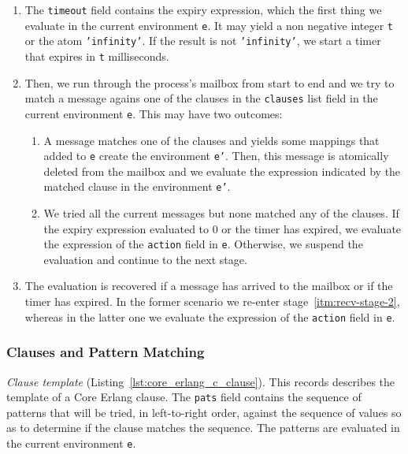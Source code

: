 \begin{enumerate}
  \item The \texttt{timeout} field contains the expiry expression, which the
    first thing we evaluate in the current environment \texttt{e}. It may yield a non
    negative integer \texttt{t} or the atom \texttt{'infinity'}. If the result
    is not \texttt{'infinity'}, we start a timer that expires in \texttt{t}
    milliseconds.
  \item\label{itm:recv-stage-2} Then, we run through the process's mailbox from start to end and we try
    to match a message agains one of the clauses in the \texttt{clauses} list
    field in the current environment \texttt{e}. This may have two outcomes:
    \begin{enumerate}
      \item A message matches one of the clauses and yields some mappings that
        added to \texttt{e} create the environment \texttt{e'}. Then, this
        message is atomically deleted from the mailbox and we evaluate the
        expression indicated by the matched clause in the environment \texttt{e'}.
      \item We tried all the current messages but none matched any of the
        clauses. If the expiry expression evaluated to 0 or the timer has
        expired, we evaluate the expression of the \texttt{action} field in
        \texttt{e}. Otherwise, we suspend the evaluation and continue to the
        next stage.
    \end{enumerate}
  \item The evaluation is recovered if a message has arrived to the mailbox or
    if the timer has expired. In the former scenario we re-enter stage~\ref{itm:recv-stage-2},
    whereas in the latter one we evaluate the expression of the \texttt{action}
    field in \texttt{e}.
\end{enumerate}

\subsubsection{Clauses and Pattern Matching}


\emph{Clause template} (Listing~\ref{lst:core_erlang_c_clause}).
This records describes the template of a Core Erlang clause. The \texttt{pats}
field contains the sequence of patterns that will be tried, in left-to-right order,
against the sequence of values so as to determine if the clause matches the
sequence. The patterns are evaluated in the current environment \texttt{e}.

